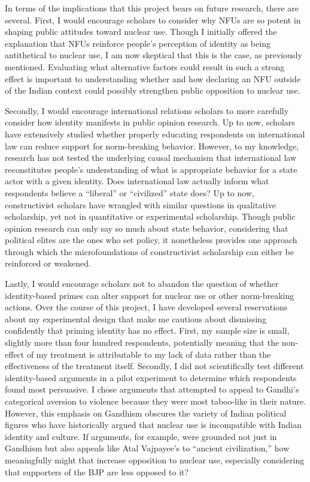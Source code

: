 \documentclass[12pt]{article}
\begin{document}
In terms of the implications that this project bears on future research, there are several. First, I would encourage scholars to consider why NFUs are so potent in shaping public attitudes toward nuclear use. Though I initially offered the explanation that NFUs reinforce people's perception of identity as being antithetical to nuclear use, I am now skeptical that this is the case, as previously mentioned. Evaluating what alternative factors could result in such a strong effect is important to understanding whether and how declaring an NFU outside of the Indian context could possibly strengthen public opposition to nuclear use.

Secondly, I would encourage international relations scholars to more carefully consider how identity manifests in public opinion research. Up to now, scholars have extensively studied whether properly educating respondents on international law can reduce support for norm-breaking behavior. However, to my knowledge, research has not tested the underlying causal mechanism that international law reconstitutes people's understanding of what is appropriate behavior for a state actor with a given identity. Does international law actually inform what respondents believe a “liberal” or “civilized” state does? Up to now, constructivist scholars have wrangled with similar questions in qualitative scholarship, yet not in quantitative or experimental scholarship. Though public opinion research can only say so much about state behavior, considering that political elites are the ones who set policy, it nonetheless provides one approach through which the microfoundations of constructivist scholarship can either be reinforced or weakened. 

Lastly, I would encourage scholars not to abandon the question of whether identity-based primes can alter support for nuclear use or other norm-breaking actions. Over the course of this project, I have developed several reservations about my experimental design that make me cautious about dismissing confidently that priming identity has no effect. First, my sample size is small, slightly more than four hundred respondents, potentially meaning that the non-effect of my treatment is attributable to my lack of data rather than the effectiveness of the treatment itself. Secondly, I did not scientifically test different identity-based arguments in a pilot experiment to determine which respondents found most persuasive. I chose arguments that attempted to appeal to Gandhi's categorical aversion to violence because they were most taboo-like in their nature. However, this emphasis on Gandhism obscures the variety of Indian political figures who have historically argued that nuclear use is incompatible with Indian identity and culture. If arguments, for example, were grounded not just in Gandhism but also appeals like Atal Vajpayee's to “ancient civilization,” how meaningfully might that increase opposition to nuclear use, especially considering that supporters of the BJP are less opposed to it? 
\end{document}
